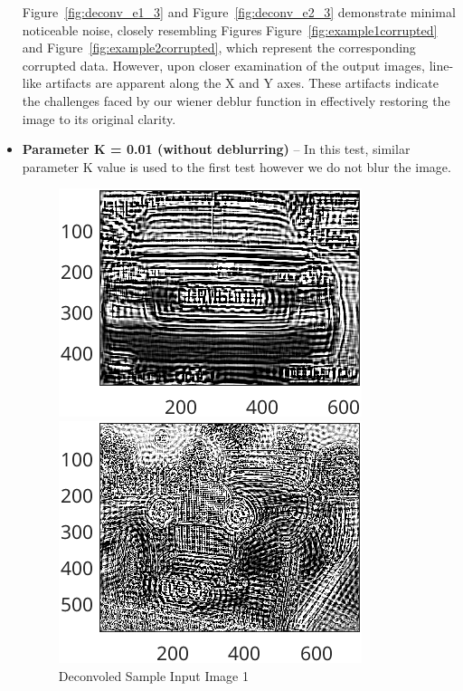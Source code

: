 \documentclass{article}
\begin{document}
\begin{itemize}
			{Figure~\ref{fig:deconv_e1_3}} and {Figure~\ref{fig:deconv_e2_3}} demonstrate minimal noticeable noise, closely resembling Figures {Figure~\ref{fig:example1corrupted}} and 
			{Figure~\ref{fig:example2corrupted}}, which represent the corresponding corrupted data. However, upon closer examination of the output images, line-like artifacts are apparent along the 
			X and Y axes. These artifacts indicate the challenges faced by our wiener deblur function in effectively restoring the image to its original clarity.

		\item \textbf{Parameter K = 0.01 (without deblurring)} – In this test, similar parameter K value is used to the first test however we do not blur the image.

  		\begin{figure}[ht]
  			\centering
  			\begin{minipage}[t]{0.45\textwidth}
    			\centering
    			\includegraphics[width=\textwidth]{2AE1NoBlur}
    			\caption{Deconvoled Sample Input Image 1}
    			\label{fig:deconv_e1_4}
  			\end{minipage}\hfill
  			\begin{minipage}[t]{0.45\textwidth}
    			\centering
    			\includegraphics[width=\textwidth]{2AE2NoBlur}

\end{minipage}
\end{figure}
\end{itemize}
\end{document}

